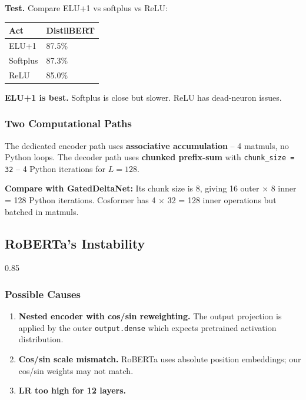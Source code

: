\textbf{Test.} Compare ELU+1 vs softplus vs ReLU:

\begin{table}[H]
\centering
\small
\begin{tabular}{ll}
\toprule
\textbf{Act} & \textbf{DistilBERT} \\
\midrule
ELU+1 & 87.5\% \\
Softplus & 87.3\% \\
ReLU & 85.0\% \\
\bottomrule
\end{tabular}
\end{table}

\textbf{ELU+1 is best.} Softplus is close but slower. ReLU has dead-neuron 
issues.

\subsubsection{Two Computational Paths}

The dedicated encoder path uses \textbf{associative accumulation} -- 4 matmuls, 
no Python loops. The decoder path uses \textbf{chunked prefix-sum} with 
\texttt{chunk\_size = 32} -- 4 Python iterations for $L=128$.

\textbf{Compare with GatedDeltaNet:} Its chunk size is 8, giving 16 outer $\times$ 8 inner = 128 Python iterations. Cosformer has 4 $\times$ 32 = 128 inner operations but batched in matmuls.

\subsection{RoBERTa's Instability}

0.85

\subsubsection{Possible Causes}

\begin{enumerate}
\item \textbf{Nested encoder with cos/sin reweighting.} The output projection is
  applied by the outer \texttt{output.dense} which expects pretrained activation
  distribution.
\item \textbf{Cos/sin scale mismatch.} RoBERTa uses absolute position embeddings;
  our cos/sin weights may not match.
\item \textbf{LR too high for 12 layers.}

\end{enumerate}
